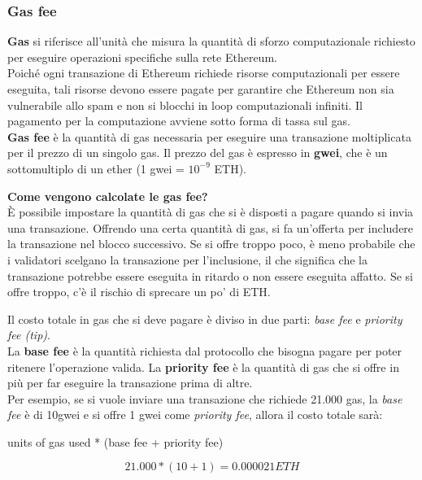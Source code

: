 \subsubsection{Gas fee}
\textbf{Gas} si riferisce all'unità che misura la quantità di sforzo computazionale
richiesto per eseguire operazioni specifiche sulla rete Ethereum. \\
Poiché ogni transazione di Ethereum richiede risorse computazionali per essere
eseguita, tali risorse devono essere pagate per garantire che Ethereum non sia
vulnerabile allo spam e non si blocchi in loop computazionali infiniti. Il
pagamento per la computazione avviene sotto forma di tassa sul gas. \\
\textbf{Gas fee} è la quantità di gas necessaria per eseguire una transazione
moltiplicata per il prezzo di un singolo gas. Il prezzo del gas è espresso in
\textbf{gwei}, che è un sottomultiplo di un ether (1 gwei = $10^{-9}$ ETH).

\textbf{Come vengono calcolate le gas fee?} \\
È possibile impostare la quantità di gas che si è disposti a pagare quando si
invia una transazione. Offrendo una certa quantità di gas, si fa un'offerta per
includere la transazione nel blocco successivo. Se si offre troppo poco, è meno
probabile che i validatori scelgano la transazione per l'inclusione, il che
significa che la transazione potrebbe essere eseguita in ritardo o non essere
eseguita affatto. Se si offre troppo, c'è il rischio di sprecare un po' di ETH.

Il costo totale in gas che si deve pagare è diviso in due parti: 
\textit{base fee} e \textit{priority fee (tip)}. \\
La \textbf{base fee} è la quantità richiesta dal protocollo che bisogna pagare
per poter ritenere l'operazione valida. La \textbf{priority fee} è la quantità
di gas che si offre in più per far eseguire la transazione prima di altre. \\
Per esempio, se si vuole inviare una transazione che richiede 21.000 gas, la
\textit{base fee} è di 10gwei e si offre 1 gwei come \textit{priority fee},
allora il costo totale sarà: 
\begin{center}
units of gas used * (base fee + priority fee)
\end{center}
\begin{equation}
    \label{eq:gasFee}
    21.000 * (10 + 1) = 0.000021 ETH
\end{equation}

